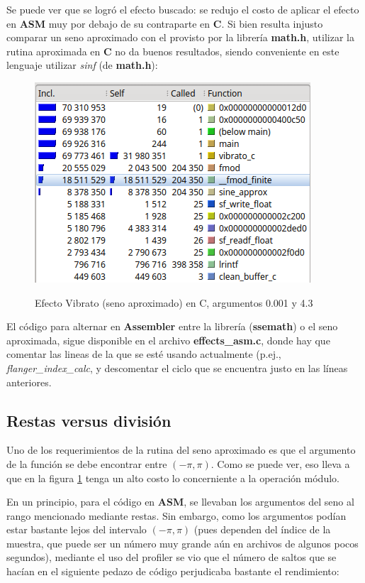 Se puede ver que se logró el efecto buscado: se redujo el costo de aplicar el efecto en \textbf{ASM} muy por debajo de su contraparte en \textbf{C}. Si bien resulta injusto comparar un seno aproximado con el provisto por la librería \textbf{math.h}, utilizar la rutina aproximada en \textbf{C} no da buenos resultados, siendo conveniente en este lenguaje utilizar \textit{sinf} (de \textbf{math.h}):

\begin{figure}[H]
    \centering
    \includegraphics[scale=0.8]{imagenes/callgrind-c-seno-approx.png}
    \label{fig:callgrind-asm-27512}
    \caption{Efecto Vibrato (seno aproximado) en C, argumentos 0.001 y 4.3}
\end{figure}

El código para alternar en \textbf{Assembler} entre la librería (\textbf{ssemath}) o el seno aproximada, sigue disponible en el archivo \textbf{effects\_asm.c}, donde hay que comentar las lineas de la que se esté usando actualmente (p.ej., \textit{flanger\_index\_calc}, y descomentar el ciclo que se encuentra justo en las líneas anteriores.

\subsection{Restas versus división}
\label{subsec:desarrollo-problemas-modulo}
Uno de los requerimientos de la rutina del seno aproximado es que el argumento de la función se debe encontrar entre $(-\pi,\pi)$. Como se puede ver, eso lleva a que en la figura \ref{fig:callgrind-asm-27512} tenga un alto costo lo concerniente a la operación módulo. 

En un principio, para el código en \textbf{ASM}, se llevaban los argumentos del seno al rango mencionado mediante restas. Sin embargo, como los argumentos podían estar bastante lejos del intervalo $(-\pi, \pi)$ (pues dependen del índice de la muestra, que puede ser un número muy grande aún en archivos de algunos pocos segundos), mediante el uso del profiler se vio que el número de saltos que se hacían en el siguiente pedazo de código perjudicaba bastante el rendimiento:\vspace{\baselineskip}

